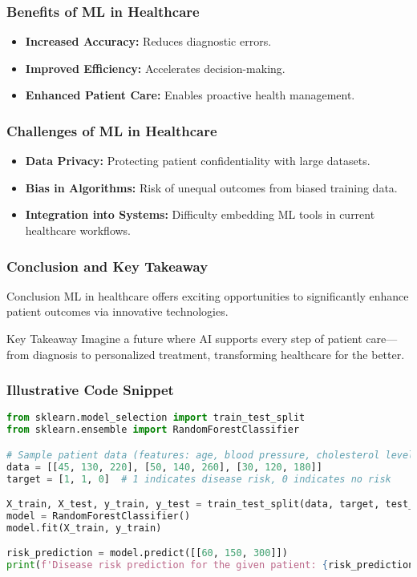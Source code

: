 \documentclass[aspectratio=169]{beamer}
\begin{document}
\begin{frame}[fragile]
    \frametitle{Benefits of ML in Healthcare}
    \begin{itemize}
        \item \textbf{Increased Accuracy:} Reduces diagnostic errors.
        \item \textbf{Improved Efficiency:} Accelerates decision-making.
        \item \textbf{Enhanced Patient Care:} Enables proactive health management.
    \end{itemize}
\end{frame}

\begin{frame}[fragile]
    \frametitle{Challenges of ML in Healthcare}
    \begin{itemize}
        \item \textbf{Data Privacy:} Protecting patient confidentiality with large datasets.
        \item \textbf{Bias in Algorithms:} Risk of unequal outcomes from biased training data.
        \item \textbf{Integration into Systems:} Difficulty embedding ML tools in current healthcare workflows.
    \end{itemize}
\end{frame}

\begin{frame}[fragile]
    \frametitle{Conclusion and Key Takeaway}
    \begin{block}{Conclusion}
        ML in healthcare offers exciting opportunities to significantly enhance patient outcomes via innovative technologies.
    \end{block}
    \begin{block}{Key Takeaway}
        Imagine a future where AI supports every step of patient care—from diagnosis to personalized treatment, transforming healthcare for the better.
    \end{block}
\end{frame}

\begin{frame}[fragile]
    \frametitle{Illustrative Code Snippet}
    \begin{lstlisting}[language=Python]
from sklearn.model_selection import train_test_split
from sklearn.ensemble import RandomForestClassifier

# Sample patient data (features: age, blood pressure, cholesterol level; target: disease risk)
data = [[45, 130, 220], [50, 140, 260], [30, 120, 180]]
target = [1, 1, 0]  # 1 indicates disease risk, 0 indicates no risk

X_train, X_test, y_train, y_test = train_test_split(data, target, test_size=0.2)
model = RandomForestClassifier()
model.fit(X_train, y_train)

risk_prediction = model.predict([[60, 150, 300]])
print(f'Disease risk prediction for the given patient: {risk_prediction[0]}')
    \end{lstlisting}
\end{frame}
\end{document}
